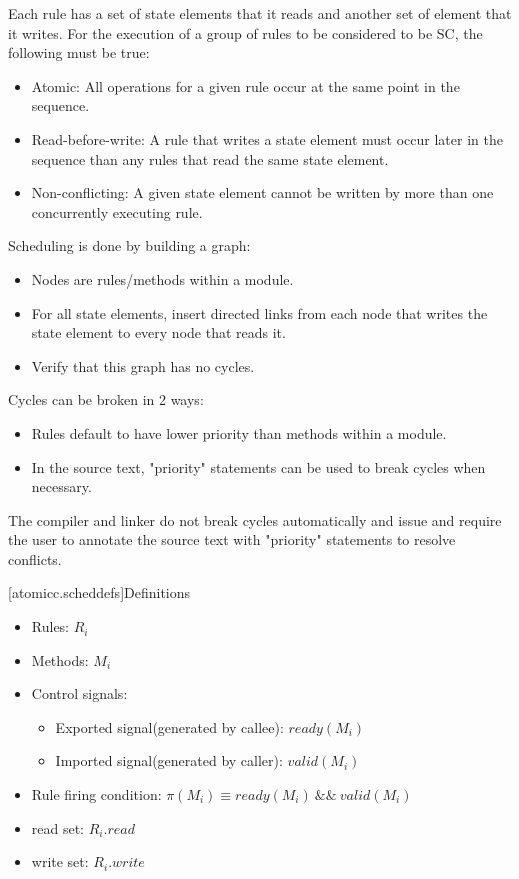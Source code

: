 Each rule has a set of state elements that it reads and another set of element that it writes.
For the execution of a group of rules to be considered to be SC, the following must
be true:

\begin{itemize}
\item Atomic: All operations for a given rule occur at the same point in the sequence.
\item Read-before-write:  A rule that writes a state element must occur later in the sequence
than any rules that read the same state element.
\item Non-conflicting: A given state element cannot be written by more than one concurrently executing rule.
\end{itemize}

Scheduling is done by building a graph:
\begin{itemize}
\item Nodes are rules/methods within a module.
\item For all state elements, insert directed links from each node that writes the state element to every node that reads it.
\item Verify that this graph has no cycles.
\end{itemize}

Cycles can be broken in 2 ways:
\begin{itemize}
\item Rules default to have lower priority than methods within a module.
\item In the source text, "priority" statements can be used to break cycles when necessary.
\end{itemize}

The compiler and linker do not break cycles automatically and issue and require the user to annotate
the source text with "priority" statements to resolve conflicts.

[atomicc.scheddefs]{Definitions}
\begin{itemize}
\item Rules: $R_{i}$
\item Methods: $M_{i}$
\item Control signals:
\begin {itemize}
\item Exported signal(generated by callee):  $ready(M_{i})$
\item Imported signal(generated by caller):  $valid(M_{i})$
\end{itemize}
\item Rule firing condition: \(\pi(M_{i}) \equiv ready(M_{i})\ \&\&\ valid(M_{i})\)
\item read set: \(R_{i}.read\)
\item write set: \(R_{i}.write\)
\end{itemize}

